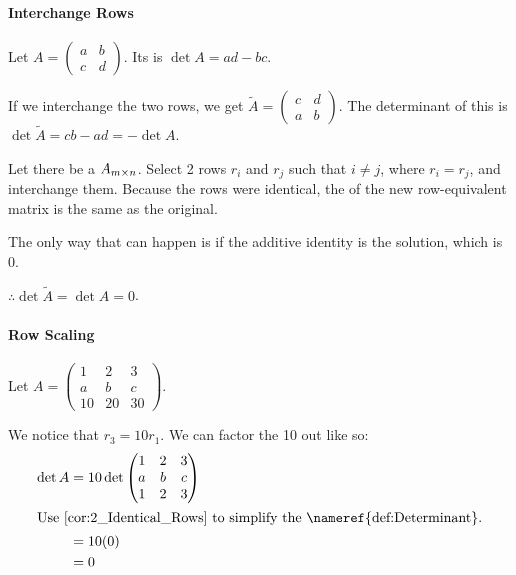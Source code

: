 \paragraph{Interchange Rows}
Let $A =
\begin{pmatrix}
  a & b \\
  c & d
\end{pmatrix}
$.
Its  is $\det A = ad - bc$.

If we interchange the two rows, we get $\tilde{A} =
\begin{pmatrix}
  c & d \\
  a & b
\end{pmatrix}$.
The determinant of this is $\det \tilde{A} = cb - ad = -\det A$.

\begin{corollary}\label{cor:2_Identical_Rows}
  Let there be a  $A_{m \times n}$.
  Select 2 rows $r_{i}$ and $r_{j}$ such that $i \neq j$, where $r_{i} = r_{j}$, and interchange them.
  Because the rows were identical, the  of the new row-equivalent matrix is the same as the original.

  The only way that can happen is if the additive identity is the solution, which is 0.

  $\therefore \det \tilde{A} = \det A = 0$.
\end{corollary}

\paragraph{Row Scaling}
Let $A =
\begin{pmatrix}
  1 & 2 & 3 \\
  a & b & c \\
  10 & 20 & 30
\end{pmatrix}$.

We notice that $r_{3} = 10r_{1}$.
We can factor the 10 out like so:
\begin{align*}
  \det A &= 10 \det
  \begin{pmatrix}
    1 & 2 & 3 \\
    a & b & c \\
    1 & 2 & 3
  \end{pmatrix} \\
  \intertext{Use \Cref{cor:2_Identical_Rows} to simplify the \nameref{def:Determinant}.}
         &= 10 (0) \\
         &= 0
\end{align*}

